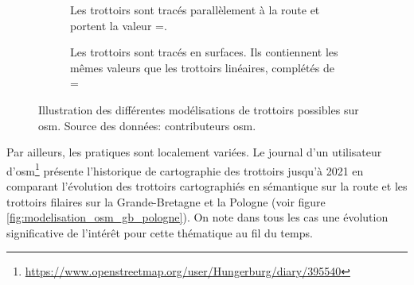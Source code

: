 \begin{figure}[ht]
\begin{subfigure}[t]{.32\linewidth}
        \caption{Les trottoirs sont tracés parallèlement à la route et portent la valeur =.}
    \end{subfigure}
    \hfill
    \begin{subfigure}[t]{.32\linewidth}
        \caption{Les trottoirs sont tracés en surfaces. Ils contiennent les mêmes valeurs que les trottoirs linéaires, complétés de =}
    \end{subfigure}
    \caption[Différentes modélisation de trottoirs sur OpenStreetMap]{Illustration des différentes modélisations de trottoirs possibles sur \gls{osm}. Source des données: contributeurs \gls{osm}.}
    \label{fig:modelisation_trottoir_osm}
\end{figure}

\newpar{}


Par ailleurs, les pratiques sont localement variées. Le journal d'un utilisateur d'\gls{osm}\footnote{\url{https://www.openstreetmap.org/user/Hungerburg/diary/395540}} présente l'historique de cartographie des trottoirs jusqu'à 2021 en comparant l'évolution des trottoirs cartographiés en sémantique sur la route et les trottoirs filaires sur la Grande-Bretagne et la Pologne (voir figure \ref{fig:modelisation_osm_gb_pologne}). On note dans tous les cas une évolution significative de l'intérêt pour cette thématique au fil du temps.

